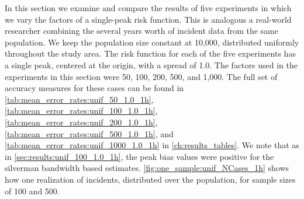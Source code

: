 In this section we examine and compare the results of five experiments in which we vary the \glspl{factor}
of a single-peak risk function.
This is analogous a real-world researcher combining the several years worth of incident data from the same population.
We keep the population size constant at 10,000, distributed uniformly throughout the study area.
The risk function for each of the five experiments has a single peak,
centered at the origin,
with a \gls{spread} of 1.0.
The \glspl{factor} used in the experiments in this section were 50, 100, 200, 500, and 1,000.
The full set of accuracy measures for these cases can be found in \autoref{tab:mean_error_rates:unif_50_1.0_1h}, \autoref{tab:mean_error_rates:unif_100_1.0_1h}, \autoref{tab:mean_error_rates:unif_200_1.0_1h}, \autoref{tab:mean_error_rates:unif_500_1.0_1h}, and \autoref{tab:mean_error_rates:unif_1000_1.0_1h} in \autoref{ch:results_tables}.
We note that as in \cref{sec:results:unif_100_1.0_1h}, the \gls{peak bias} values were positive for the \gls{silverman} bandwidth based estimates.
\autoref{fig:one_sample:unif_NCases_1h} shows how one realization of incidents, distributed over the population, for sample sizes of 100 and 500.

